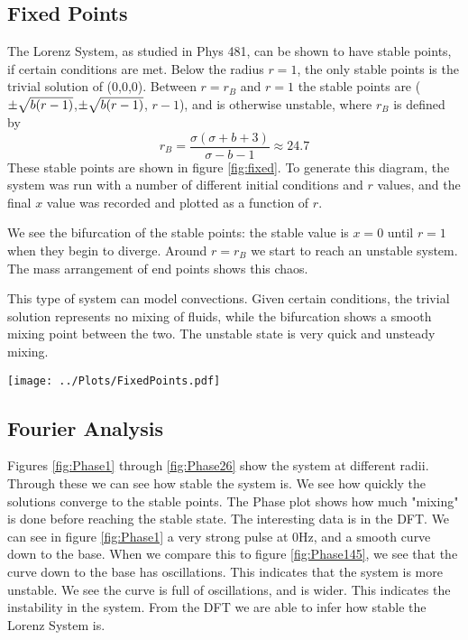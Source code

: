 \documentclass[twocolumn]{myarticle}
\begin{document}
\subsection{Fixed Points}
The Lorenz System, as studied in Phys 481, can be shown to have stable points, if certain conditions are met. Below the radius $r=1$, the only stable points is the trivial solution of (0,0,0). Between $r=r_{B}$ and $r=1$ the stable points are ($\pm \sqrtsign{b(r-1)}$,$\pm \sqrtsign{b(r-1)}$, $r-1$), and is otherwise unstable, where $r_{B}$ is defined by
\begin{equation*}
r_{B} = \frac{\sigma (\sigma + b + 3)}{\sigma - b -1} \approx 24.7
\end{equation*}
These stable points are shown in figure \ref{fig:fixed}. 
To generate this diagram, the system was run with a number of different initial conditions and $ r $ values, and the final $ x $ value was recorded and plotted as a function of $ r $.

We see the bifurcation of the stable points: the stable value is $ x = 0 $ until $ r =1 $ when they begin to diverge. 
Around $r=r_{B}$ we start to reach an unstable system. 
The mass arrangement of end points shows this chaos. 

This type of system can model convections. 
Given certain conditions, the trivial solution represents no mixing of fluids, while the bifurcation shows a smooth mixing point between the two. 
The unstable state is very quick and unsteady mixing.

\begin{figure*}[htb]
    \centering
    \texttt{[image: ../Plots/FixedPoints.pdf]}
    \caption{Bifurcation Diagram for the Lorenz System.}
    \label{fig:fixed}
\end{figure*}

\subsection{Fourier Analysis}
Figures \ref{fig:Phase1} through \ref{fig:Phase26} show the system at different radii. 
Through these we can see how stable the system is. 
We see how quickly the solutions converge to the stable points. 
The Phase plot shows how much "mixing" is done before reaching the stable state. 
The interesting data is in the DFT. 
We can see in figure \ref{fig:Phase1} a very strong pulse at 0Hz, and a smooth curve down to the base. 
When we compare this to figure \ref{fig:Phase145}, we see that the curve down to the base has oscillations. 
This indicates that the system is more unstable. 
We see the curve is full of oscillations, and is wider. 
This indicates the instability in the system. From the DFT we are able to infer how stable the Lorenz System is.
\end{document}
